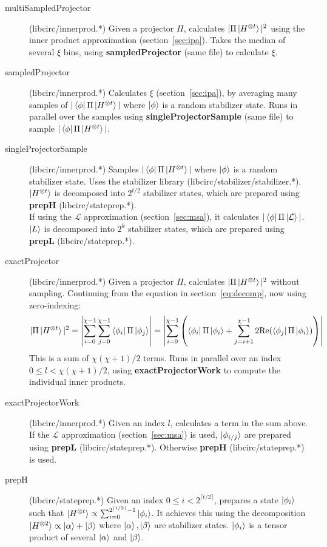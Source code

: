 \documentclass[11pt]{article}
\begin{document}
\begin{description}
    \item[multiSampledProjector] (libcirc/innerprod.*) Given a projector $\Pi$, calculates $|\Pi\ket{H^{\otimes t}}|^2$ using the inner product approximation (section~\ref{sec:ipa}). Takes the median of several $\xi$ bins, using \textbf{sampledProjector} (same file) to calculate $\xi$.
    \item[sampledProjector] (libcirc/innerprod.*) Calculates $\xi$ (section~\ref{sec:ipa}), by averaging many samples of $|\bra{\phi}\Pi\ket{H^{\otimes t}}|$ where $\ket{\phi}$ is a random stabilizer state. Runs in parallel over the samples using \textbf{singleProjectorSample} (same file) to sample $|\bra{\phi}\Pi\ket{H^{\otimes t}}|$.
    \item[singleProjectorSample] (libcirc/innerprod.*) Samples $|\bra{\phi}\Pi\ket{H^{\otimes t}}|$ where $\ket{\phi}$ is a random stabilizer state. Uses the stabilizer library (libcirc/stabilizer/stabilizer.*). $\ket{H^{\otimes t}}$ is decomposed into $2^{t/2}$ stabilizer states, which are prepared using \textbf{prepH} (libcirc/stateprep.*).\\ If using the $\mathcal{L}$ approximation (section~\ref{sec:msa}), it calculates $|\bra{\phi}\Pi\ket{\mathcal{L}}|$. $\ket{L}$ is decomposed into $2^k$ stabilizer states, which are prepared using \textbf{prepL} (libcirc/stateprep.*).



    \item[exactProjector] (libcirc/innerprod.*) Given a projector $\Pi$, calculates $|\Pi\ket{H^{\otimes t}}|^2$ without sampling. Continuing from the equation in section~\ref{eq:decomp}, now using zero-indexing:
        $$ |\Pi\ket{H^{\otimes t}}|^2 = \left| \sum^{\chi-1}_{i=0} \sum^{\chi-1}_{j=0}\bra{\phi_i}\Pi\ket{\phi_j}\right| = \left| \sum^{\chi-1}_{i=0}\left( \bra{\phi_i}\Pi\ket{\phi_i} + \sum^{\chi-1}_{j=i+1}2\text{Re}( \bra{\phi_j}\Pi\ket{\phi_i})\right)\right| $$
        This is a sum of $\chi(\chi+1)/2$ terms. Runs in parallel over an index $0 \leq l < \chi(\chi+1)/2$, using \textbf{exactProjectorWork} to compute the individual inner products.

    \item[exactProjectorWork] (libcirc/innerprod.*) Given an index $l$, calculates a term in the sum above. If the $\mathcal{L}$ approximation (section~\ref{sec:msa}) is used, $\ket{\phi_{i/j}}$ are prepared using \textbf{prepL} (libcirc/stateprep.*). Otherwise \textbf{prepH} (libcirc/stateprep.*) is used.

    \item[prepH] (libcirc/stateprep.*) Given an index $0 \leq i < 2^{\lceil t/2\rceil}$, prepares a state $\ket{\phi_i}$ such that $\ket{H^{\otimes t}} \propto \sum_{i=0}^{2^{\lceil t/2 \rceil}-1} \ket{\phi_i} $. It achieves this using the decomposition $\ket{H^{\otimes 2}} \propto \ket{\alpha} + \ket{\beta}$ where $\ket{\alpha},\ket{\beta}$ are stabilizer states. $\ket{\phi_i}$ is a tensor product of several $\ket{\alpha}$ and $\ket{\beta}$. 
    

\end{description}
\end{document}
